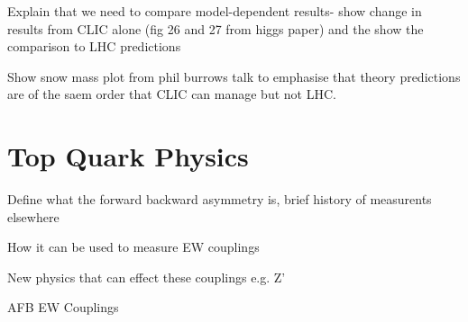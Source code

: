 Explain that we need to compare model-dependent results- show change in results from CLIC alone (fig 26 and 27 from higgs paper) and the show the comparison to LHC predictions

Show snow mass plot from phil burrows talk to emphasise that theory predictions are of the saem order that CLIC can manage but not LHC. 

\section{Top Quark Physics}

Define what the forward backward asymmetry is, brief history of measurents elsewhere

How it can be used to measure EW couplings

New physics that can effect these couplings e.g. Z'



AFB
EW Couplings


